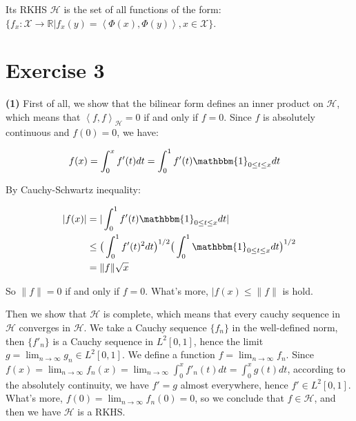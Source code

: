 \documentclass[11pt]{article}
\begin{document}
    Its RKHS $\mathcal{H}$ is the set of all functions of the form: $\{f_x: \mathcal{X} \to \mathbb{R} | f_x (y) = \left \langle \Phi (x), \Phi (y) \right \rangle, x \in \mathcal{X}\}$.

    \section*{Exercise 3} 

    \textbf{(1)} First of all, we show that the bilinear form defines an inner product on $\mathcal{H}$, which means that $\left \langle f, f \right \rangle_{\mathcal{H}} = 0$ if and only if $f = 0$.
    Since $f$ is absolutely continuous and $f(0) = 0$, we have:

    \vspace{-4em}
    \begin{align*}
      f(x) &= \int_{0}^x f'(t) dt = \int_0^1 f'(t) \mathbbm{1}_{0 \le t \le x} dt 
    \end{align*}
    \vspace{-4em}

    By Cauchy-Schwartz inequality:

    \vspace{-4em}
    \begin{align*}
      |f(x)| &= |\int_0^1 f'(t) \mathbbm{1}_{0 \le t \le x} dt| \\
      &\le \big (\int_0^1 f'(t)^2 dt \big )^{1/2} \big (\int_0^1 \mathbbm{1}_{0 \le t \le x} dt \big )^{1/2} \\
      &= \|f\| \sqrt{x}
    \end{align*}
    \vspace{-4em}

    So $\|f\| = 0$ if and only if $f = 0$. What's more, $|f(x) \le \|f\|$ is hold.

    Then we show that $\mathcal{H}$ is complete, which means that every cauchy sequence in $\mathcal{H}$ converges in $\mathcal{H}$. 
    We take a Cauchy sequence $\{f_n\}$ in the well-defined norm, then $\{f'_n\}$ is a Cauchy sequence in $L^2 [0, 1]$, 
    hence the limit $g = \lim_{n \to \infty} g_n \in L^2 [0, 1]$. We define a function $f = \lim_{n \to \infty} f_n$. 
    Since $f(x) = \lim_{n \to \infty} f_n (x) = \lim_{n \to \infty} \int_0^x f'_n (t)dt = \int_0^x g(t) dt$, according to the absolutely continuity, we have $f' = g$ almost everywhere, 
    hence $f' \in L^2 [0, 1]$. What's more, $f(0) = \lim_{n \to \infty} f_n (0) = 0$, so we conclude that $f \in \mathcal{H}$, and then we have $\mathcal{H}$ is a RKHS.
\end{document}
